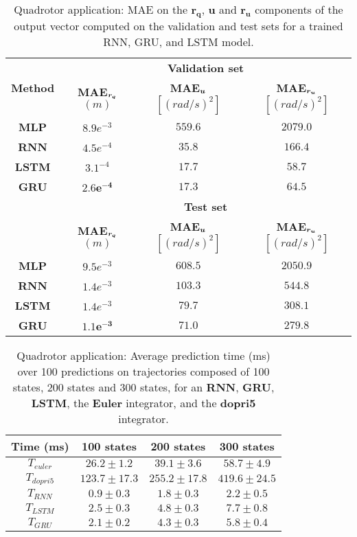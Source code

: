 \begin{table}[b!]
\centering
\begin{tabular}{ | c | c  c  c | }
\hline
    \multirow{2}{*}{\textbf{Method}} & \multicolumn{3}{c|}{\textbf{Validation set}} \\ \cline{2-4}
    & \textbf{MAE$_{\boldsymbol{r_q}}$} $(m)$  & \textbf{MAE$_{\boldsymbol{u}}$} $[(rad/s)^2]$ & \textbf{MAE$_{\boldsymbol{r_u}}$} $[(rad/s)^2]$ \\ \hline
{\textbf{MLP}} & $8.9e^{-3}$ & $559.6$ & $2079.0$ \\ 
{\textbf{RNN}} & $4.5e^{-4}$ & $35.8$ & $166.4$ \\ 
{\textbf{LSTM}} & $3.1^{-4}$ & $17.7$ & $\boldsymbol{58.7}$ \\ 
{\textbf{GRU}} & $\boldsymbol{2.6e^{-4}}$ & $\boldsymbol{17.3}$ & $64.5$ \\ 
\hline
    & \multicolumn{3}{c|}{\textbf{Test set}}\\ \cline{2-4}
    & \textbf{MAE$_{\boldsymbol{r_q}}$} $(m)$  & \textbf{MAE$_{\boldsymbol{u}}$} $[(rad/s)^2]$ & \textbf{MAE$_{\boldsymbol{r_u}}$} $[(rad/s)^2]$ \\ \hline
{\textbf{MLP}} & $9.5e^{-3}$ & $608.5$ & $2050.9$ \\ 
{\textbf{RNN}} &  $1.4e^{-3}$ & $103.3$ & $544.8$ \\ 
{\textbf{LSTM}} & $1.4e^{-3}$ & $79.7$ & $308.1$ \\ 
{\textbf{GRU}} & $\boldsymbol{1.1e^{-3}}$ & $\boldsymbol{71.0}$ & $\boldsymbol{279.8}$ \\ 
\hline
    
\end{tabular}
\caption{
    Quadrotor application: MAE on the $\boldsymbol{r_q}$, $\boldsymbol{u}$ and $\boldsymbol{r_u}$ components of the output vector computed on the validation and test sets for a trained RNN, GRU, and LSTM model.}
    \label{tab:NN_results_table_Q}
\end{table}

\begin{table}[t!]
\centering
\begin{tabular}{ | c | c  c  c | }
\hline
    \textbf{Time (ms)} & 100 states  & 200 states & 300 states \\ \hline
    $T_{euler}$ & $26.2 \pm 1.2$ & $39.1 \pm 3.6$ & $58.7 \pm 4.9$ \\ 
$T_{dopri5}$ & $123.7 \pm 17.3$ & $255.2 \pm 17.8$ & $419.6 \pm 24.5$ \\ 
$T_{RNN}$ & $\boldsymbol{0.9} \pm 0.3$ & $\boldsymbol{1.8} \pm 0.3$ & $\boldsymbol{2.2} \pm 0.5$ \\ 
$T_{LSTM}$ & $2.5 \pm 0.3$ & $4.8 \pm 0.3$ & $7.7 \pm 0.8$ \\ 
$T_{GRU}$ & $2.1 \pm 0.2$ & $4.3 \pm 0.3$ & $5.8 \pm 0.4$  \\ \hline
\end{tabular}
\caption{
    Quadrotor application: Average prediction time (ms) over 100 predictions on trajectories composed of 100 states, 200 states and 300 states, for an \textbf{RNN}, \textbf{GRU}, \textbf{LSTM}, the \textbf{Euler} integrator, and the \textbf{dopri5} integrator.}
    \label{tab:timepred}
\end{table}